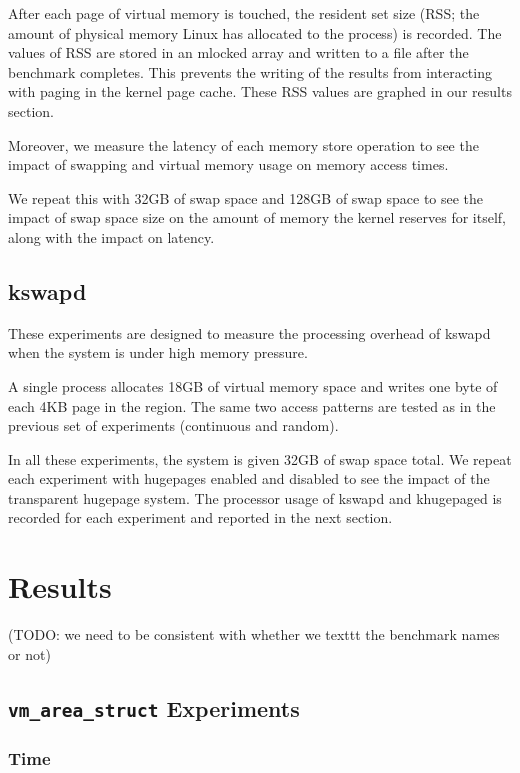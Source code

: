 \documentclass[twocolumn,11pt]{article}
\begin{document}
After each page of virtual memory is touched, the resident set size (RSS; the
amount of physical memory Linux has allocated to the process) is recorded.  The
values of RSS are stored in an mlocked array and written to a file after the
benchmark completes. This prevents the writing of the results from interacting
with paging in the kernel page cache. These RSS values are graphed in our
results section.

Moreover, we measure the latency of each memory store operation to see the
impact of swapping and virtual memory usage on memory access times.

We repeat this with 32GB of swap space and 128GB of swap space to see the
impact of swap space size on the amount of memory the kernel reserves for
itself, along with the impact on latency.

\subsection{kswapd}

These experiments are designed to measure the processing overhead of kswapd when
the system is under high memory pressure.

A single process allocates 18GB of virtual memory space and writes one byte of
each 4KB page in the region. The same two access patterns are tested as in the
previous set of experiments (continuous and random).

In all these experiments, the system is given 32GB of swap space total. We
repeat each experiment with hugepages enabled and disabled to see the impact of
the transparent hugepage system. The processor usage of kswapd and khugepaged is
recorded for each experiment and reported in the next section.

\section{Results}

(TODO: we need to be consistent with whether we texttt the benchmark names or
not)

\subsection{\texttt{vm\_area\_struct} Experiments}

\subsubsection{Time}
\end{document}
